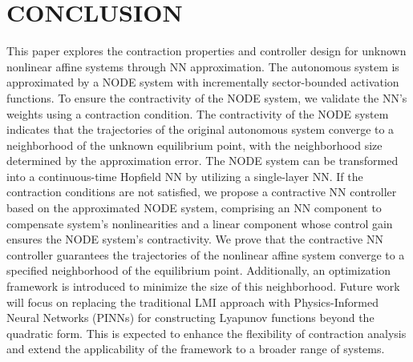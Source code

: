 \documentclass[journal,twoside,web]{ieeecolor}
\begin{document}
\section{CONCLUSION}\label{secc}
This paper explores the contraction properties and controller design for unknown nonlinear affine systems through NN approximation. The autonomous system is approximated by a NODE system with incrementally sector-bounded activation functions. To ensure the contractivity of the NODE system, we validate the NN’s weights using a contraction condition. The contractivity of the NODE system indicates that the trajectories of the original autonomous system converge to a neighborhood of the unknown equilibrium point, with the neighborhood size determined by the approximation error. The NODE system can be transformed into a continuous-time Hopfield NN by utilizing a single-layer NN. If the contraction conditions are not satisfied, we propose a contractive NN controller based on the approximated NODE system, comprising an NN component to compensate system's nonlinearities and a linear component whose control gain ensures the NODE system’s contractivity. We prove that the contractive NN controller guarantees the trajectories of the nonlinear affine system converge to a specified neighborhood of the equilibrium point. Additionally, an optimization framework is introduced to minimize the size of this neighborhood. Future work will focus on replacing the traditional LMI approach with Physics-Informed Neural Networks (PINNs) for constructing Lyapunov functions beyond the quadratic form. This is expected to enhance the flexibility of contraction analysis and extend the applicability of the framework to a broader range of systems.
\end{document}
